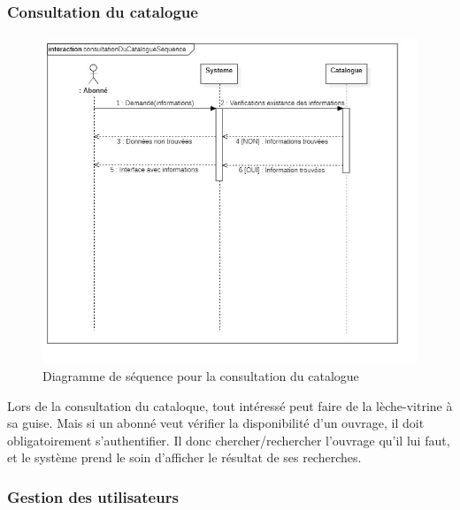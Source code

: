 \subsubsection{Consultation du catalogue} 
\paragraph{}
\begin{figure}[h]
        \centering
        \includegraphics[width=1\textwidth]{consultationDuCatalogueSequence}
        \caption{Diagramme de séquence pour la consultation du catalogue}
        \label{image-consultationDuCatalogueSequence}
        \end{figure}
\par 
Lors de la consultation du cataloque, tout intéressé peut faire de la lèche-vitrine à 
sa guise. Mais si un abonné veut vérifier la disponibilité d'un ouvrage, il doit 
obligatoirement s'authentifier. Il donc chercher/rechercher l'ouvrage qu'il lui faut, et le 
système prend le soin d'afficher le résultat de ses recherches.
\subsubsection{Gestion des utilisateurs} 
